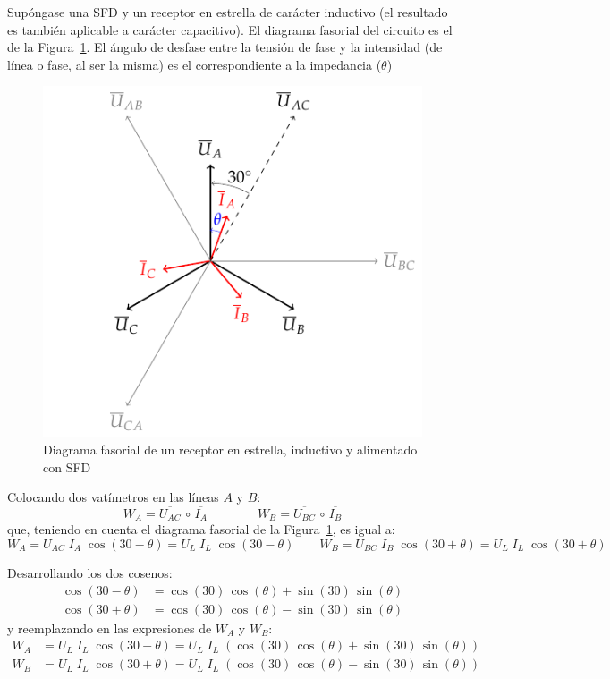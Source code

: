 \documentclass[11pt]{book} %
\numberwithin{dummy}{section}
\theoremstyle{ocrenumbox}
\theoremstyle{blacknumex}
\theoremstyle{blacknumbox}
\theoremstyle{ocrenum}
\newlength\esp
\begin{document}
	Supóngase una SFD y un receptor en estrella de carácter inductivo (el resultado es también aplicable a carácter capacitivo). El diagrama fasorial del circuito es el de la Figura~\ref{fig.fasores_potencia3H}. El ángulo de desfase entre la tensión de fase y la intensidad (de línea o fase, al ser la misma) es el correspondiente a la impedancia ($\theta$)
	\begin{figure}[htbp]
	    \centering
	    \includegraphics{../figs/fasores_potencia3H.pdf}
	    \caption{Diagrama fasorial de un receptor en estrella, inductivo y alimentado con SFD}
	    \label{fig.fasores_potencia3H}
	\end{figure}
	
	Colocando dos vatímetros en las líneas $A$ y $B$:
	\begin{equation*}
	    W_A=\overline{U_{AC}}\,\circ\,\overline{I_A}\qquad\qquad W_B=\overline{U_{BC}}\,\circ\,\overline{I_B}
	\end{equation*}
	que, teniendo en cuenta el diagrama fasorial de la Figura~\ref{fig.fasores_potencia3H}, es igual a: 
	\begin{equation*}
	    W_A={U_{AC}}\; {I_A}\;\cos{(30-\theta)}=U_L\;I_L\;\cos{(30-\theta)}\qquad W_B={U_{BC}}\; {I_B}\;\cos{(30+\theta)}=U_L\;I_L\;\cos{(30+\theta)}
	\end{equation*}
	
	Desarrollando los dos cosenos:
\begin{align*}
  \cos({30} - \theta) &= \cos({30})\,\cos(\theta) + \sin({30})\,\sin(\theta)\\
  \cos({30} + \theta) &= \cos({30})\,\cos(\theta) - \sin({30})\,\sin(\theta)
\end{align*}
y reemplazando en las expresiones de $W_A$ y $W_B$:
\begin{align*}
    W_A&=U_L\;I_L\;\cos{(30-\theta)}=U_L\;I_L\;\left( \cos({30})\,\cos(\theta) + \sin({30})\,\sin(\theta)\right)\\
    W_B&=U_L\;I_L\;\cos{(30+\theta)}=U_L\;I_L\;\left( \cos({30})\,\cos(\theta) - \sin({30})\,\sin(\theta)\right)
\end{align*}
\end{document}
